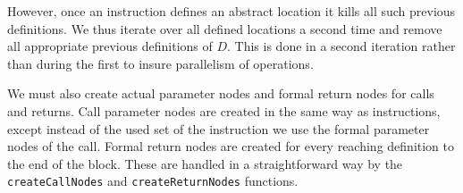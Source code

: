 \documentclass[11pt]{article}
\begin{document}
However, once an instruction defines an abstract location it kills all
such previous definitions. We thus iterate over all defined locations
a second time and remove all appropriate previous definitions of
$D$. This is done in a second iteration rather than during the first
to insure parallelism of operations. 

We must also create actual parameter nodes and formal return nodes for
calls and returns. Call parameter nodes are created in the same way as
instructions, except instead of the used set of the instruction we use
the formal parameter nodes of the call. Formal return nodes are
created for every reaching definition to the end of the block. These
are handled in a straightforward way by the \texttt{createCallNodes}
and \texttt{createReturnNodes} functions.
\end{document}
